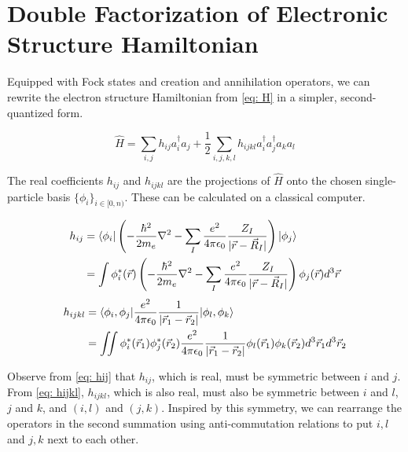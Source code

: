 \section{Double Factorization of Electronic Structure Hamiltonian}

Equipped with Fock states and creation and annihilation operators, we can rewrite the electron structure Hamiltonian from \eqref{eq: H} in a simpler, second-quantized form.

\begin{equation}
    \hat{H} = \sum_{i, j} h_{ij}a^\dag_ia_j + \frac{1}{2}\sum_{i,j,k,l} h_{ijkl}a^\dag_ia^\dag_ja_ka_l \label{eq: H2}
\end{equation}

The real coefficients $h_{ij}$ and $h_{ijkl}$ are the projections of $\hat{H}$ onto the chosen single-particle basis $\{\phi_i\}_{i \in [0, n)}$. These can be calculated on a classical computer.

\begin{equation}
    \begin{split}
        h_{ij} &= \braket{\phi_i | \left(-\frac{\hbar^2}{2m_e}\nabla^2 - \sum_I \frac{e^2}{4\pi\epsilon_0}\frac{Z_I}{|\vec{r} - \vec{R}_I|}\right) | \phi_j} \\
        &= \int \phi^*_i(\vec{r})\left(-\frac{\hbar^2}{2m_e}\nabla^2 - \sum_I \frac{e^2}{4\pi\epsilon_0}\frac{Z_I}{|\vec{r} - \vec{R}_I|}\right)\phi_j(\vec{r}) d^3\vec{r}
    \end{split}
    \label{eq: hij}
\end{equation}
\begin{equation}
    \begin{split}
        h_{ijkl} &= \braket{\phi_i, \phi_j | \frac{e^2}{4\pi\epsilon_0}\frac{1}{|\vec{r}_1 - \vec{r}_2|} | \phi_l, \phi_k} \\
        &= \iint \phi^*_i(\vec{r}_1)\phi^*_j(\vec{r}_2)\frac{e^2}{4\pi\epsilon_0}\frac{1}{|\vec{r}_1 - \vec{r}_2|}\phi_l(\vec{r}_1)\phi_k(\vec{r}_2) d^3\vec{r}_1d^3\vec{r}_2
    \end{split}
    \label{eq: hijkl}
\end{equation}

Observe from \eqref{eq: hij} that $h_{ij}$, which is real, must be symmetric between $i$ and $j$. From \eqref{eq: hijkl}, $h_{ijkl}$, which is also real, must also be symmetric between $i$ and $l$, $j$ and $k$, and $(i, l)$ and $(j, k)$. Inspired by this symmetry, we can rearrange the operators in the second summation using anti-commutation relations to put $i, l$ and $j, k$ next to each other.

